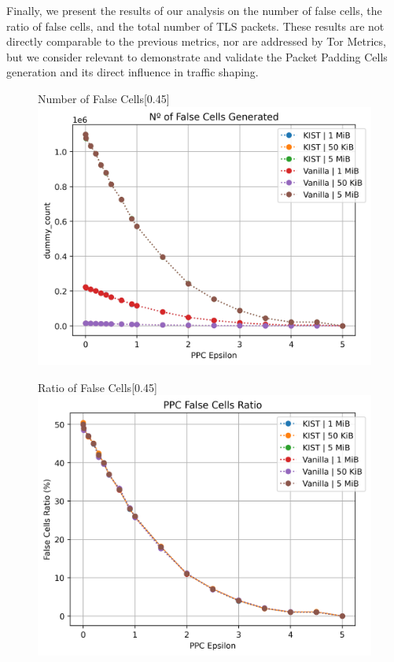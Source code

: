 Finally, we present the results of our analysis on the number of false cells, the ratio of false cells, and the total number of TLS packets. These results are not directly comparable to the previous metrics, nor are addressed by Tor Metrics, but we consider relevant to demonstrate and validate the Packet Padding Cells generation and its direct influence in traffic shaping.

\begin{figure}[htbp]
    \centering
    \begin{subcaptionbox}{Number of False Cells\label{fig:local_dummy_count}}[0.45\textwidth]
        {\includegraphics[width=\linewidth]{Chapters/Figures/Plots/local_PPC_count.png}}
    \end{subcaptionbox}
    \hfill
    \begin{subcaptionbox}{Ratio of False Cells\label{fig:local_dummy_ratio}}[0.45\textwidth]
        {\includegraphics[width=\linewidth]{Chapters/Figures/Plots/local_PPC Ratio_5mib.png}}

\end{subcaptionbox}
\end{figure}
